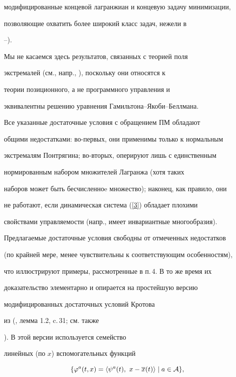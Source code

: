 модифицированные концевой лагранжиан и концевую задачу минимизации,


позволяющие охватить более широкий класс задач, нежели в


\cite{2}--\cite{6}).





Мы не касаемся здесь результатов, связанных с теорией поля


экстремалей (см., напр., \cite{9}), поскольку они относятся к


теории позиционного, а не программного управления и


эквивалентны решению уравнения Гамильтона--Якоби--Беллмана.








Все указанные достаточные условия с обращением ПМ обладают


общими недостатками: во-первых, они применимы только к нормальным


экстремалям Понтрягина; во-вторых, оперируют лишь с единственным


нормированным набором множителей Лагранжа (хотя таких


наборов может быть бесчисленноe множество); наконец, как правило, они


не работают, если динамическая система (\ref{3}) обладает плохими


свойствами управляемости (напр., имеет инвариантные многообразия).





Предлагаемые достаточные условия свободны от отмеченных недостатков


(по крайней мере, менее чувствительны к соответствующим особенностям),


что иллюстрируют примеры, рассмотренные в п.\,4. В то же время их


доказательство элементарно и опирается на простейшую версию


модифицированных достаточных условий Кротова


из (\cite{10}, лемма 1.2, c.\,31; см. также 


\cite{11}). В этой версии используется семейство


линейных (по $x$) вспомогательных функций


\begin{equation}


\{\varphi^a (t,x)=\langle \psi^a (t),\ x-\overline{x}(t) \rangle


\mid a\in {\cal A} \}, \label{d4}


\end{equation}


